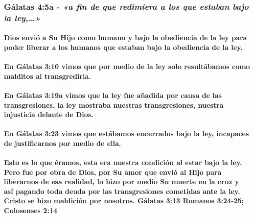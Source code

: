 \documentclass[11a pt,twoside]{article}
\newcommand{\scripture}[1]{%
  {\fontsize{12pt}{16pt}\selectfont\ScriptureFont\itshape #1}%
}
\let\oldsubsubsection\subsubsection
\renewcommand{\subsubsection}{\needspace{4\baselineskip}\oldsubsubsection}
\let\oldparagraph\paragraph
\renewcommand{\paragraph}{\needspace{3\baselineskip}\oldparagraph}
\begin{document}
\subsubsection{\texorpdfstring{Gálatas 4:5a -
\scripture{«a fin de que redimiera a los que estaban bajo la ley,…»}}{Gálatas 4:5a - }}\label{guxe1latas-45a---a-fin-de-que-redimiera-a-los-que-estaban-bajo-la-ley}

\paragraph{Dios envió a Su Hijo como humano y bajo la obediencia de la
ley para poder liberar a los humanos que estaban bajo la obediencia de
la
ley.}\label{dios-enviuxf3-a-su-hijo-como-humano-y-bajo-la-obediencia-de-la-ley-para-poder-liberar-a-los-humanos-que-estaban-bajo-la-obediencia-de-la-ley.}

\paragraph{En Gálatas 3:10 vimos que por medio de la ley solo
resultábamos como malditos al
transgredirla.}\label{en-guxe1latas-310-vimos-que-por-medio-de-la-ley-solo-resultuxe1bamos-como-malditos-al-transgredirla.}

\paragraph{En Gálatas 3:19a vimos que la ley fue añadida por causa de
las transgresiones, la ley mostraba nuestras transgresiones, nuestra
injusticia delante de
Dios.}\label{en-guxe1latas-319a-vimos-que-la-ley-fue-auxf1adida-por-causa-de-las-transgresiones-la-ley-mostraba-nuestras-transgresiones-nuestra-injusticia-delante-de-dios.}

\paragraph{En Gálatas 3:23 vimos que estábamos encerrados bajo la ley,
incapaces de justificarnos por medio de
ella.}\label{en-guxe1latas-323-vimos-que-estuxe1bamos-encerrados-bajo-la-ley-incapaces-de-justificarnos-por-medio-de-ella.}

\paragraph{Esto es lo que éramos, esta era nuestra condición al estar
bajo la ley. Pero fue por obra de Dios, por Su amor que envió al Hijo
para liberarnos de esa realidad, lo hizo por medio Su muerte en la cruz
y así pagando toda deuda por las transgresiones cometidas ante la ley.
Cristo se hizo maldición por nosotros. Gálatas 3:13 Romanos 3:24-25;
Colosenses
2:14}\label{esto-es-lo-que-uxe9ramos-esta-era-nuestra-condiciuxf3n-al-estar-bajo-la-ley.-pero-fue-por-obra-de-dios-por-su-amor-que-enviuxf3-al-hijo-para-liberarnos-de-esa-realidad-lo-hizo-por-medio-su-muerte-en-la-cruz-y-asuxed-pagando-toda-deuda-por-las-transgresiones-cometidas-ante-la-ley.-cristo-se-hizo-maldiciuxf3n-por-nosotros.-guxe1latas-313-romanos-324-25-colosenses-214}
\end{document}
